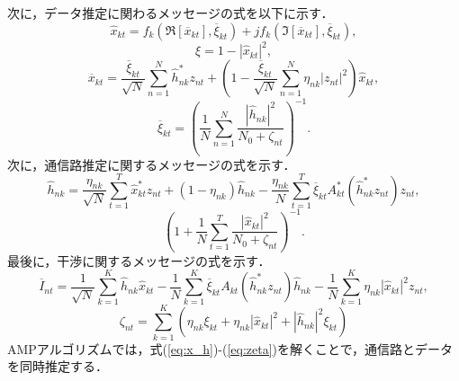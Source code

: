 次に，データ推定に関わるメッセージの式を以下に示す．
\begin{equation} 
	\label{eq:x_h}
	\hat{x}_{kt}=f_{k}(\Re[\overline{x}_{kt}],\overline{\xi}_{kt})+jf_{k}(\Im[\overline{x}_{kt}],\overline{\xi}_{kt}),
\end{equation}
\begin{equation} 
	\label{eq:xi}
	\xi = 1 - |\hat{x}_{kt}|^2,
\end{equation}
\begin{equation} 
	\label{eq:x_b}
	\overline{x}_{kt} = 
		\frac{\overline{\xi}_{kt}}{\sqrt{N}}
			\sum_{n=1}^{N}\hat{h}^{*}_{nk}z_{nt}
			+\left(
				1-\frac{\overline{\xi}_{kt}}{\sqrt{N}}\sum_{n=1}^{N}\eta_{nk}|z_{nt}|^2
			\right)
			\hat{x}_{kt},
\end{equation}
\begin{equation} 
	\label{eq:xi_b}
	\overline{\xi}_{kt}=
	\left(
		\frac{1}{N}
		\sum_{n=1}^{N}
			\frac
			{|\hat{h}_{nk}|^{2}}
			{N_{0}+\zeta_{nt}}
	\right)^{-1}.
\end{equation}
次に，通信路推定に関するメッセージの式を示す．
\begin{equation}
	\label{eq:h_h}
	\hat{h}_{nk}=
	\frac
		{\eta_{nk}}
		{\sqrt{N}}
	\sum_{t=1}^{T}
		\hat{x}^{*}_{kt}z_{nt}
	+
	\left(
		1-\eta_{nk}
	\right)
	\hat{h}_{nk}
	-
	\frac
		{\eta_{nk}}
		{N}
	\sum_{t=1}^{T}
		\overline{\xi}_{kt}
		A^{*}_{kt}
		\left(
			\hat{h}_{nk}^{*}
			z_{nt}
		\right)
		z_{nt},	
\end{equation}
\begin{equation}
	\label{eq:eta}
	\left(
		1+
		\frac{1}{N}
		\sum^{T}_{t=1}
			\frac
			{|\hat{x}_{kt}|^{2}}
			{N_{0}+\zeta_{nt}}
	\right)^{-1}.
\end{equation}
最後に，干渉に関するメッセージの式を示す．
\begin{equation}
	\label{eq:I_b}
	\overline{I}_{nt}=
		\frac{1}{\sqrt{N}}
		\sum_{k=1}^{K}
			\hat{h}_{nk}\hat{x}_{kt}
		-
		\frac{1}{N}
		\sum^{K}_{k=1}
			\overline{\xi}_{kt}
			A_{kt}
			\left(
				\hat{h}_{nk}^{*}
				z_{nt}
			\right)
			\hat{h}_{nk}
		-
		\frac{1}{N}
		\sum^{K}_{k=1}
			\eta_{nk}
			|\hat{x}_{kt}|^{2}
			z_{nt},
\end{equation}
\begin{equation}
	\label{eq:zeta}
	\zeta_{nt}=
		\sum_{k=1}^{K}
			\left(
				\eta_{nk}\xi_{kt}
				+
				\eta_{nk}|\hat{x}_{kt}|^{2}
				+
				|\hat{h}_{nk}|^{2}\xi_{kt}
			\right)
\end{equation}
AMPアルゴリズムでは，式(\ref{eq:x_h})-(\ref{eq:zeta})を解くことで，通信路とデータを同時推定する．
